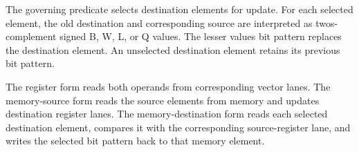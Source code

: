 The governing predicate selects destination elements for update. For each
selected element, the old destination and corresponding source are interpreted
as two\textquotesingle{}s-complement signed B, W, L, or Q values. The lesser value\textquotesingle{}s bit pattern
replaces the destination element. An unselected destination element retains its
previous bit pattern.

The register form reads both operands from corresponding vector lanes. The
memory-source form reads the source elements from memory and updates destination
register lanes. The memory-destination form reads each selected destination
element, compares it with the corresponding source-register lane, and writes
the selected bit pattern back to that memory element.
